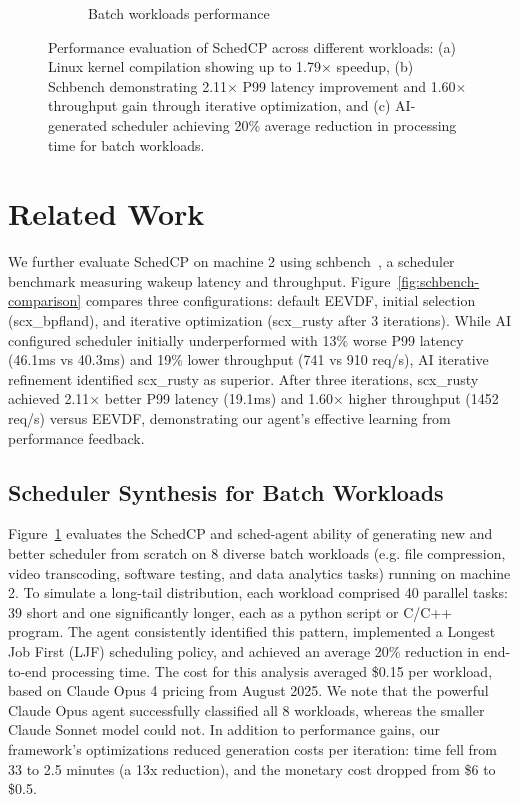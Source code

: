 \documentclass[preprint]{article}
\newcommand{\sys}{SchedCP\xspace}
\newcommand{\agent}{sched-agent\xspace}
\begin{document}
\begin{figure}[h]
\begin{minipage}{0.48\textwidth}
\begin{subfigure}[b]{\textwidth}
        \caption{Batch workloads performance}
        \label{fig:batch-performance}
    \end{subfigure}
\end{minipage}
\caption{Performance evaluation of \sys across different workloads: (a) Linux kernel compilation showing up to 1.79× speedup, (b) Schbench demonstrating 2.11× P99 latency improvement and 1.60× throughput gain through iterative optimization, and (c) AI-generated scheduler achieving 20\% average reduction in processing time for batch workloads.}
\label{fig:combined-performance}
\end{figure}


\section{Related Work}
\label{sec:related}

We further evaluate \sys on machine 2 using schbench~\cite{schbench2016}, a scheduler benchmark measuring wakeup latency and throughput. Figure~\ref{fig:schbench-comparison} compares three configurations: default EEVDF, initial selection (scx\_bpfland), and iterative optimization (scx\_rusty after 3 iterations). While AI configured scheduler initially underperformed with 13\% worse P99 latency (46.1ms vs 40.3ms) and 19\% lower throughput (741 vs 910 req/s), AI iterative refinement identified scx\_rusty as superior. After three iterations, scx\_rusty achieved 2.11× better P99 latency (19.1ms) and 1.60× higher throughput (1452 req/s) versus EEVDF, demonstrating our agent's effective learning from performance feedback.

\subsection{Scheduler Synthesis for Batch Workloads}

Figure~\ref{fig:batch-performance} evaluates the \sys  and \agent  ability of generating new and better scheduler from scratch on 8 diverse batch workloads (e.g. file compression, video transcoding, software testing, and data analytics tasks) running on machine 2. To simulate a long-tail distribution, each workload comprised 40 parallel tasks: 39 short and one significantly longer, each as a python script or C/C++ program. The agent consistently identified this pattern, implemented a Longest Job First (LJF) scheduling policy, and achieved an average 20\% reduction in end-to-end processing time. The cost for this analysis averaged \$0.15 per workload, based on Claude Opus 4 pricing from August 2025. We note that the powerful Claude Opus agent successfully classified all 8 workloads, whereas the smaller Claude Sonnet model could not. In addition to performance gains, our framework's optimizations reduced generation costs per iteration: time fell from 33 to 2.5 minutes (a 13x reduction), and the monetary cost dropped from \$6 to \$0.5.
\end{document}
